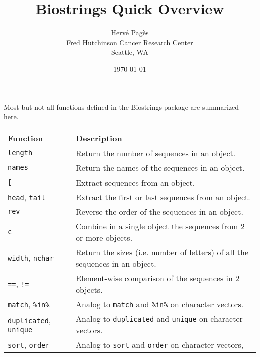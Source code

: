 \documentclass[10pt]{article}
\newcommand{\Rpackage}[1]{\textsf{#1}}
\newcommand{\Rfunction}[1]{\texttt{#1}}
\begin{document}


\title{Biostrings Quick Overview}
\author{Herv\'e Pag\`es \\
  Fred Hutchinson Cancer Research Center \\
  Seattle, WA}
\date{\today}
\maketitle


Most but not all functions defined in the \Rpackage{Biostrings} package
are summarized here.


\begin{table}[ht]
\begin{center}
\begin{tabular}{p{2.5in}|p{4in}}
{\bf Function} & {\bf Description} \\
\hline
\Rfunction{length} & Return the number of sequences in an object. \\
\hline
\Rfunction{names} & Return the names of the sequences in an object. \\
\hline
\Rfunction{[} & Extract sequences from an object. \\
\hline
\Rfunction{head}, \Rfunction{tail} & Extract the first or last sequences
    from an object. \\
\hline
\Rfunction{rev} & Reverse the order of the sequences in an object. \\
\hline
\Rfunction{c} & Combine in a single object the sequences from 2 or more objects. \\
\hline
\Rfunction{width}, \Rfunction{nchar} & Return the sizes (i.e. number of
    letters) of all the sequences in an object.\\
\hline
\Rfunction{==}, \Rfunction{!=} & Element-wise comparison of the sequences
    in 2 objects. \\
\hline
\Rfunction{match}, \Rfunction{\%in\%} &
    Analog to \Rfunction{match} and \Rfunction{\%in\%} on character vectors. \\
\hline
\Rfunction{duplicated}, \Rfunction{unique} &
    Analog to \Rfunction{duplicated} and \Rfunction{unique} on character
    vectors. \\
\hline
\Rfunction{sort}, \Rfunction{order} &
    Analog to \Rfunction{sort} and \Rfunction{order} on character vectors,

\end{tabular}
\end{center}
\end{table}
\end{document}
